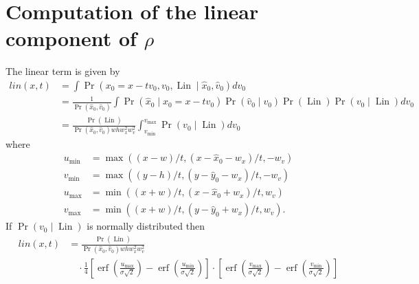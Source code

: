 \documentclass[12pt]{amsart}
\DeclareMathOperator{\Lin}{Lin}
\DeclareMathOperator{\erf}{erf}
\begin{document}
\section{Computation of the linear component of $\rho$}
The linear term is given by
\begin{align*}
	lin(x,t) &= \int \Pr( x_0 = x-t v_0, v_0, \Lin \mid \hat{x}_0, \hat{v}_0 ) dv_0 \\
	&= \frac{1}{ \Pr( \hat{x}_0, \hat{v}_0 ) } \int \Pr( \hat{x}_0 \mid x_0 = x-tv_0 ) \Pr( \hat{v}_0 \mid v_0 ) \Pr( \Lin ) \Pr( v_0 \mid \Lin)  dv_0 \\
	&= \frac{ \Pr(\Lin) }{ \Pr( \hat{x}_0 , \hat{v}_0 ) wh w_x^2 w_v^2 } \int_{v_{\min}}^{v_{\max}} \Pr(v_0 \mid \Lin ) dv_0
\end{align*}
where
\begin{align*}
	u_{\min} &= \max( (x-w)/t, (x-\hat{x}_0-w_x)/t, -w_v ) \\
	v_{\min} &= \max( (y-h)/t, (y-\hat{y}_0-w_x)/t, -w_v ) \\
	u_{\max} &=\min( (x+w)/t, (x-\hat{x}_0+w_x)/t, w_v ) \\
	v_{\max} &=\min( (x+w)/t, (y-\hat{y}_0+w_x)/t, w_v ).
\end{align*}
If $\Pr( v_0 \mid \Lin)$ is normally distributed then
\begin{align*}
	lin(x,t) &= \frac{ \Pr(\Lin) }{ \Pr( \hat{x}_0 , \hat{v}_0 ) wh w_x^2 w_v^2 } \\
	& \quad \cdot \frac{1}{4} \left[ \erf \left( \frac{ u_{\max} }{ \sigma \sqrt{2} } \right) - \erf \left( \frac{ u_{\min} }{ \sigma \sqrt{2} } \right) \right]
	\cdot \left[ \erf \left( \frac{ v_{\max} }{ \sigma \sqrt{2} } \right) - \erf \left( \frac{ v_{\min} }{ \sigma \sqrt{2} } \right) \right]
\end{align*}
\end{document}
